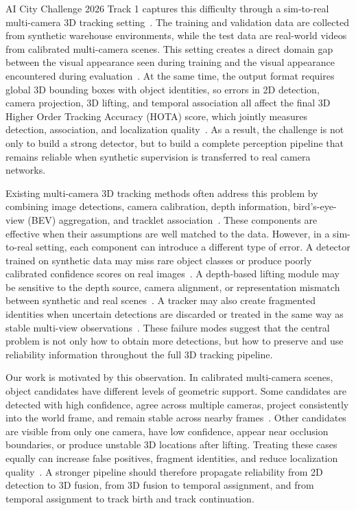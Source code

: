 \documentclass[runningheads]{llncs}
\begin{document}
AI City Challenge 2026 Track 1 captures this difficulty through a sim-to-real
multi-camera 3D tracking setting~\cite{aicity2026track1}. The training and
validation data are collected from synthetic warehouse environments, while the
test data are real-world videos from calibrated multi-camera scenes. This setting
creates a direct domain gap between the visual appearance seen during training and
the visual appearance encountered during evaluation~\cite{tobin2017domainrandomization,hoffman2018cycada}.
At the same time, the output format requires global 3D bounding boxes with object
identities, so errors in 2D detection, camera projection, 3D lifting, and temporal
association all affect the final 3D Higher Order Tracking Accuracy (HOTA) score,
which jointly measures detection, association, and localization
quality~\cite{luiten2021hota}. As a result, the challenge is not only to build a
strong detector, but to build a complete perception pipeline that remains reliable
when synthetic supervision is transferred to real camera networks.

Existing multi-camera 3D tracking methods often address this problem by combining
image detections, camera calibration, depth information, bird's-eye-view (BEV)
aggregation, and tracklet association~\cite{wang2024bevsushi,wang2025mcblt,phan2025vgcrtrack,
tran2025depthtrack,vuminh2025online3d,lee2025pointcloud}. These components are
effective when their assumptions are well matched to the data. However, in a
sim-to-real setting, each component can introduce a different type of error. A
detector trained on synthetic data may miss rare object classes or produce poorly
calibrated confidence scores on real images~\cite{guo2017calibration,ovadia2019uncertainty,
lee2025pointcloud}. A depth-based lifting module may be sensitive to the depth
source, camera alignment, or representation mismatch between synthetic and real
scenes~\cite{phan2025vgcrtrack,tran2025depthtrack,vuminh2025online3d}. A tracker
may also create fragmented identities when uncertain detections are discarded or
treated in the same way as stable multi-view observations~\cite{zhang2022bytetrack,
cetintas2023sushi}. These failure modes suggest that the central problem is not
only how to obtain more detections, but how to preserve and use reliability
information throughout the full 3D tracking pipeline.

Our work is motivated by this observation. In calibrated multi-camera scenes,
object candidates have different levels of geometric support. Some candidates are
detected with high confidence, agree across multiple cameras, project consistently
into the world frame, and remain stable across nearby frames~\cite{hou2020mvdet,
hou2021mvdetr,wang2024bevsushi}. Other candidates are visible from only one camera,
have low confidence, appear near occlusion boundaries, or produce unstable 3D
locations after lifting. Treating these cases equally can increase false positives,
fragment identities, and reduce localization quality~\cite{zhang2022bytetrack,
cetintas2023sushi,wang2025mcblt}. A stronger pipeline should therefore propagate
reliability from 2D detection to 3D fusion, from 3D fusion to temporal assignment,
and from temporal assignment to track birth and track continuation.
\end{document}
